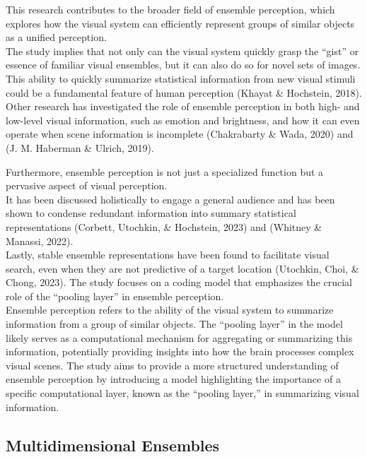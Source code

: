 \documentclass[print]{nuthesis}
\begin{document}
This research contributes to the broader field of ensemble perception, which explores how the visual system can efficiently represent groups of similar objects as a unified perception.\\
The study implies that not only can the visual system quickly grasp the ``gist'' or essence of familiar visual ensembles, but it can also do so for novel sets of images.\\
This ability to quickly summarize statistical information from new visual stimuli could be a fundamental feature of human perception (Khayat \& Hochstein, 2018).\\
Other research has investigated the role of ensemble perception in both high- and low-level visual information, such as emotion and brightness, and how it can even operate when scene information is incomplete (Chakrabarty \& Wada, 2020) and (J. M. Haberman \& Ulrich, 2019).

Furthermore, ensemble perception is not just a specialized function but a pervasive aspect of visual perception.\\
It has been discussed holistically to engage a general audience and has been shown to condense redundant information into summary statistical representations (Corbett, Utochkin, \& Hochstein, 2023) and (Whitney \& Manassi, 2022).\\
Lastly, stable ensemble representations have been found to facilitate visual search, even when they are not predictive of a target location (Utochkin, Choi, \& Chong, 2023).
The study focuses on a coding model that emphasizes the crucial role of the ``pooling layer'' in ensemble perception.\\
Ensemble perception refers to the ability of the visual system to summarize information from a group of similar objects.
The ``pooling layer'' in the model likely serves as a computational mechanism for aggregating or summarizing this information, potentially providing insights into how the brain processes complex visual scenes.
The study aims to provide a more structured understanding of ensemble perception by introducing a model highlighting the importance of a specific computational layer, known as the ``pooling layer,'' in summarizing visual information.

\hypertarget{multidimensional-ensembles}{%
\subsection{Multidimensional Ensembles}\label{multidimensional-ensembles}}
\end{document}
